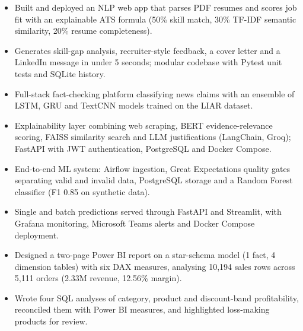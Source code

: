 \begin{itemize}
  \item Built and deployed an NLP web app that parses PDF resumes and scores job fit with an explainable ATS formula (50\% skill match, 30\% TF-IDF semantic similarity, 20\% resume completeness).
  \item Generates skill-gap analysis, recruiter-style feedback, a cover letter and a LinkedIn message in under 5 seconds; modular codebase with Pytest unit tests and SQLite history.
\end{itemize}

\begin{itemize}
  \item Full-stack fact-checking platform classifying news claims with an ensemble of LSTM, GRU and TextCNN models trained on the LIAR dataset.
  \item Explainability layer combining web scraping, BERT evidence-relevance scoring, FAISS similarity search and LLM justifications (LangChain, Groq); FastAPI with JWT authentication, PostgreSQL and Docker Compose.
\end{itemize}

\begin{itemize}
  \item End-to-end ML system: Airflow ingestion, Great Expectations quality gates separating valid and invalid data, PostgreSQL storage and a Random Forest classifier (F1 0.85 on synthetic data).
  \item Single and batch predictions served through FastAPI and Streamlit, with Grafana monitoring, Microsoft Teams alerts and Docker Compose deployment.
\end{itemize}

\begin{itemize}
  \item Designed a two-page Power BI report on a star-schema model (1 fact, 4 dimension tables) with six DAX measures, analysing 10,194 sales rows across 5,111 orders (2.33M revenue, 12.56\% margin).
  \item Wrote four SQL analyses of category, product and discount-band profitability, reconciled them with Power BI measures, and highlighted loss-making products for review.
\end{itemize}


